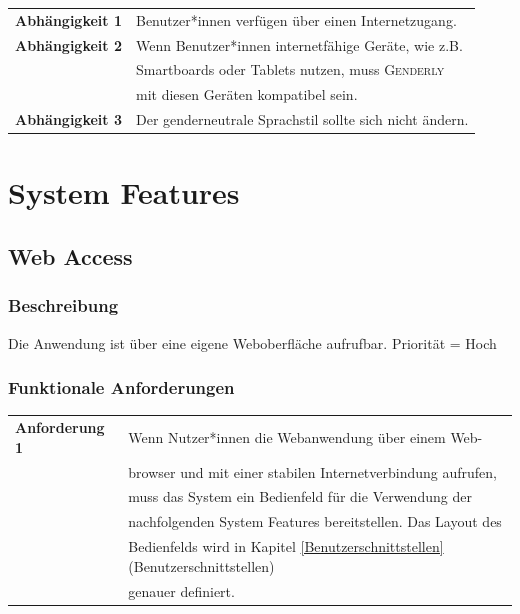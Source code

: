 \documentclass[paper=a4, parskip=half]{scrreprt}
\newcommand{\Genderly}{\textsc{Genderly}}
\begin{document}
\begin{table}[!htb]
\begin{tabular}{ll}
\textbf{Abhängigkeit 1} & Benutzer*innen verfügen über einen Internetzugang. \vspace{0.15cm} \\
\textbf{Abhängigkeit 2} & Wenn Benutzer*innen internetfähige Geräte, wie z.B. \\
& Smartboards oder Tablets nutzen, muss \Genderly{}\\
& mit diesen Geräten kompatibel sein. \vspace{0.15cm}\\
\textbf{Abhängigkeit 3} & Der genderneutrale Sprachstil sollte sich nicht ändern. \vspace{0.15cm}\\
\end{tabular}
\end{table}


\chapter{System Features}
\section{Web Access}
\subsection{Beschreibung}
Die Anwendung ist über eine eigene Weboberfläche aufrufbar. Priorität = Hoch
\subsection{Funktionale Anforderungen}
\begin{table}[!htb]
\begin{tabular}{ll}
\textbf{Anforderung 1} & Wenn Nutzer*innen die Webanwendung über einem Web- \\
& browser und mit einer stabilen Internetverbindung aufrufen, \\
& muss das System ein Bedienfeld für die Verwendung der \\
& nachfolgenden System Features bereitstellen. Das Layout des \\
& Bedienfelds wird in Kapitel \ref{Benutzerschnittstellen} (Benutzerschnittstellen) \\
& genauer definiert. \vspace{0.15cm} \\

\end{tabular}
\end{table}
\end{document}
